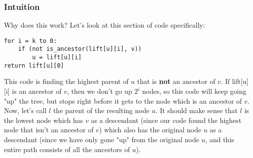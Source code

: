 \documentclass{article}
\begin{document}
\subsubsection{Intuition}
Why does this work? Let's look at this section of code specifically:
\begin{lstlisting}
for i = k to 0:
	if (not is_ancestor(lift[u][i], v))
		u = lift[u][i]
return lift[u][0]
\end{lstlisting}

This code is finding the highest parent of $u$ that is \textbf{not} an ancestor of $v$. If lift[u][i] is an ancestor of $v$, then we don't go up $2^i$ nodes, so this code will keep going "up" the tree, but stops right before it gets to the node which is an ancestor of $v$. Now, let's call $l$ the parent of the resulting node $u$. It should make sense that $l$ is the lowest node which has $v$ as a descendant (since our code found the highest node that isn't an ancestor of $v$) which also has the original node $u$ as a descendant (since we have only gone "up" from the original node $u$, and this entire path consists of all the ancestors of $u$).

%
%     
% 
 
\end{document}
